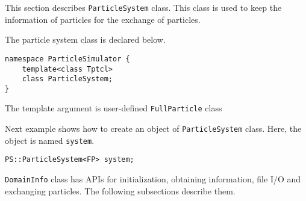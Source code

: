 
This section describes {\tt ParticleSystem} class. This class is used
to keep the information of particles for the exchange of particles.



The particle system class is declared below.

\begin{lstlisting}[caption=ParticleSystem0]
namespace ParticleSimulator {
    template<class Tptcl>
    class ParticleSystem;
}
\end{lstlisting}

The template argument is user-defined {\tt FullParticle} class


Next example shows how to create an object of {\tt ParticleSystem} class.
Here, the object is named {\tt system}.

\begin{screen}
\begin{verbatim}
PS::ParticleSystem<FP> system;
\end{verbatim}
\end{screen}




{\tt DomainInfo} class has APIs for initialization, obtaining
information, file I/O and exchanging particles. The following
subsections describe them.



